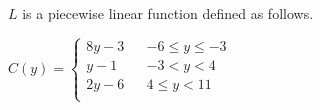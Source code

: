 \documentclass{ximera}
\begin{document}
\begin{definition}
$L$ is a piecewise linear function defined as follows.

$C(y) =   
\left \{ \begin{aligned}     
8 y - 3 && -6 \leq y \leq -3 \\        
y - 1 && -3 < y < 4 \\      
2y -6 && 4 \leq y < 11\\       
\end{aligned} \right .$ 


\end{definition}
\end{document}
